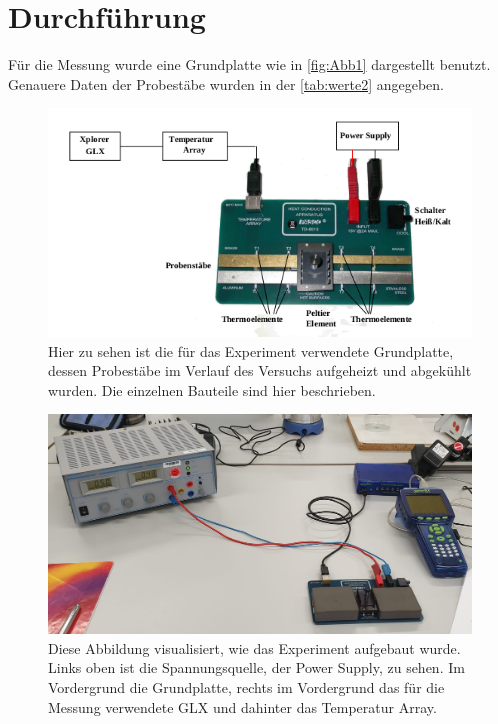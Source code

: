 \section{Durchführung}
\label{sec:Durchführung}

Für die Messung wurde eine Grundplatte wie in \autoref{fig:Abb1} dargestellt benutzt. Genauere Daten der Probestäbe wurden in der \autoref{tab:werte2} angegeben.

\begin{figure}
    \centering
    \includegraphics[scale=0.7]{content/Bilder/Aufbau.png}
    \caption{Hier zu sehen ist die für das Experiment verwendete Grundplatte, dessen Probestäbe im Verlauf des Versuchs aufgeheizt und abgekühlt wurden. Die einzelnen Bauteile sind hier beschrieben.}
    \label{fig:Abb1}
\end{figure}
\begin{figure}
    \centering
    \includegraphics[scale=0.2]{content/Bilder/Aufbau2.png}
    \caption{Diese Abbildung visualisiert, wie das Experiment aufgebaut wurde. Links oben ist die Spannungsquelle, der Power Supply, zu sehen. Im Vordergrund die Grundplatte, rechts im Vordergrund das für die Messung verwendete GLX und dahinter das Temperatur Array.}
    \label{fig:Abb2}
\end{figure}
